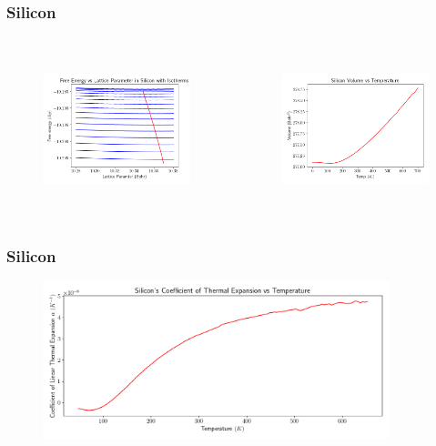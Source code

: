\documentclass{beamer}
\begin{document}
\begin{frame}
	\frametitle{Silicon}
	\begin{columns}
	\begin{figure}[ht]
	\begin{center}
	\includegraphics[height=1.8in]{silicon_isotherms.png}
	\end{center}
	\end{figure}
	\begin{figure}[ht]
	\begin{center}
	\includegraphics[height=1.8in]{silicon_min_volume.png}
	\end{center}
	\end{figure}
\end{columns}
\end{frame}

\begin{frame}
	\frametitle{Silicon \alpha}
	\begin{figure}[ht]
	\begin{center}
		\includegraphics[height=1.8in]{silicon_thermal_expansion.png}
	\end{center}
	\end{figure}
\end{frame}
\end{document}

